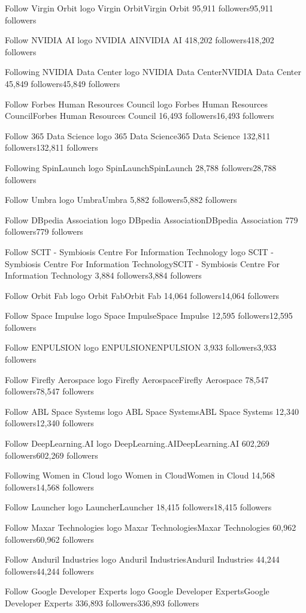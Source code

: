 Follow
Virgin Orbit logo
Virgin OrbitVirgin Orbit
95,911 followers95,911 followers

Follow
NVIDIA AI logo
NVIDIA AINVIDIA AI
418,202 followers418,202 followers

Following
NVIDIA Data Center logo
NVIDIA Data CenterNVIDIA Data Center
45,849 followers45,849 followers

Follow
Forbes Human Resources Council logo
Forbes Human Resources CouncilForbes Human Resources Council
16,493 followers16,493 followers

Follow
365 Data Science logo
365 Data Science365 Data Science
132,811 followers132,811 followers

Following
SpinLaunch logo
SpinLaunchSpinLaunch
28,788 followers28,788 followers

Follow
Umbra logo
UmbraUmbra
5,882 followers5,882 followers

Follow
DBpedia Association logo
DBpedia AssociationDBpedia Association
779 followers779 followers

Follow
SCIT - Symbiosis Centre For Information Technology logo
SCIT - Symbiosis Centre For Information TechnologySCIT - Symbiosis Centre For Information Technology
3,884 followers3,884 followers

Follow
Orbit Fab logo
Orbit FabOrbit Fab
14,064 followers14,064 followers

Follow
Space Impulse logo
Space ImpulseSpace Impulse
12,595 followers12,595 followers

Follow
ENPULSION logo
ENPULSIONENPULSION
3,933 followers3,933 followers

Follow
Firefly Aerospace logo
Firefly AerospaceFirefly Aerospace
78,547 followers78,547 followers

Follow
ABL Space Systems logo
ABL Space SystemsABL Space Systems
12,340 followers12,340 followers

Follow
DeepLearning.AI logo
DeepLearning.AIDeepLearning.AI
602,269 followers602,269 followers

Following
Women in Cloud logo
Women in CloudWomen in Cloud
14,568 followers14,568 followers

Follow
Launcher logo
LauncherLauncher
18,415 followers18,415 followers

Follow
Maxar Technologies logo
Maxar TechnologiesMaxar Technologies
60,962 followers60,962 followers

Follow
Anduril Industries logo
Anduril IndustriesAnduril Industries
44,244 followers44,244 followers

Follow
Google Developer Experts logo
Google Developer ExpertsGoogle Developer Experts
336,893 followers336,893 followers

